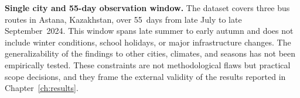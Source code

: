 \textbf{Single city and 55-day observation window.} The dataset covers three bus routes in Astana, Kazakhstan, over 55~days from late July to late September~2024. This window spans late summer to early autumn and does not include winter conditions, school holidays, or major infrastructure changes. The generalizability of the findings to other cities, climates, and seasons has not been empirically tested. These constraints are not methodological flaws but practical scope decisions, and they frame the external validity of the results reported in Chapter~\ref{ch:results}.